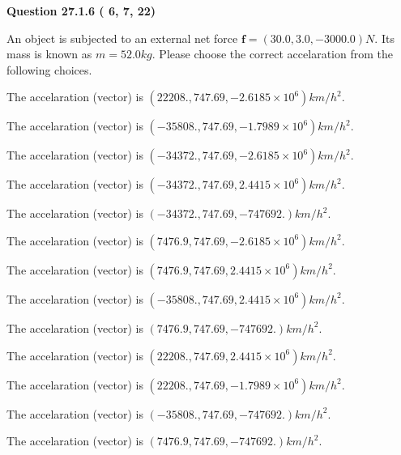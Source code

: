 \documentclass[12pt]{article}
\begin{document}
   
  
\vspace{0.2in}
  
{\textbf{\Large{Question
27.1.6 
 (          6,          7,         22)
}}}
  
  
 
An object is subjected to an external net force $\mathbf{f}=(
30.0 ,
3.0,
-3000.0  )N$. Its mass is known as
$m= %
52.0  kg$. Please choose the correct accelaration
from the following choices.
 
 
 
The accelaration (vector) is
$(
22208.,
747.69 ,
-2.6185 \times 10^{6}
)km/h^2.
$
 
 
The accelaration (vector) is
$(
-35808.,
747.69 ,
-1.7989 \times 10^{6}
)km/h^2.
$
 
 
The accelaration (vector) is
$(
-34372.,
747.69 ,
-2.6185 \times 10^{6}
)km/h^2.
$
 
 
The accelaration (vector) is
$(
-34372.,
747.69 ,
2.4415 \times 10^{6}
)km/h^2.
$
 
 
The accelaration (vector) is
$(
-34372.,
747.69 ,
-747692.
)km/h^2.
$
 
 
The accelaration (vector) is
$(
7476.9,
747.69 ,
-2.6185 \times 10^{6}
)km/h^2.
$
 
 
The accelaration (vector) is
$(
7476.9,
747.69 ,
2.4415 \times 10^{6}
)km/h^2.
$
 
 
The accelaration (vector) is
$(
-35808.,
747.69 ,
2.4415 \times 10^{6}
)km/h^2.
$
 
 
The accelaration (vector) is
$(
7476.9,
747.69 ,
-747692.
)km/h^2.
$
 
 
The accelaration (vector) is
$(
22208.,
747.69 ,
2.4415 \times 10^{6}
)km/h^2.
$
 
 
The accelaration (vector) is
$(
22208.,
747.69 ,
-1.7989 \times 10^{6}
)km/h^2.
$
 
 
The accelaration (vector) is
$(
-35808.,
747.69 ,
-747692.
)km/h^2.
$
 
 
\noindent{}
 
 
The accelaration (vector) is
$(
7476.9,
747.69 ,
-747692.
)km/h^2.
$
 
\end{document}
